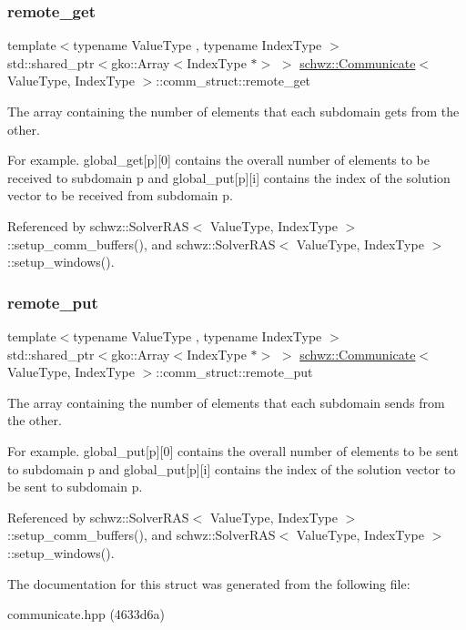 \subsubsection{\texorpdfstring{remote\+\_\+get}{remote\_get}}
{\footnotesize\ttfamily template$<$typename Value\+Type , typename Index\+Type $>$ \\
std\+::shared\+\_\+ptr$<$gko\+::\+Array$<$Index\+Type $\ast$$>$ $>$ \hyperlink{classschwz_1_1Communicate}{schwz\+::\+Communicate}$<$ Value\+Type, Index\+Type $>$\+::comm\+\_\+struct\+::remote\+\_\+get}



The array containing the number of elements that each subdomain gets from the other. 

For example. global\+\_\+get\mbox{[}p\mbox{]}\mbox{[}0\mbox{]} contains the overall number of elements to be received to subdomain p and global\+\_\+put\mbox{[}p\mbox{]}\mbox{[}i\mbox{]} contains the index of the solution vector to be received from subdomain p. 

Referenced by schwz\+::\+Solver\+R\+A\+S$<$ Value\+Type, Index\+Type $>$\+::setup\+\_\+comm\+\_\+buffers(), and schwz\+::\+Solver\+R\+A\+S$<$ Value\+Type, Index\+Type $>$\+::setup\+\_\+windows().

\mbox{\label{structschwz_1_1Communicate_1_1comm__struct_a977cf8a2800021a50e59ee5cefb2a0ca}} 
\subsubsection{\texorpdfstring{remote\+\_\+put}{remote\_put}}
{\footnotesize\ttfamily template$<$typename Value\+Type , typename Index\+Type $>$ \\
std\+::shared\+\_\+ptr$<$gko\+::\+Array$<$Index\+Type $\ast$$>$ $>$ \hyperlink{classschwz_1_1Communicate}{schwz\+::\+Communicate}$<$ Value\+Type, Index\+Type $>$\+::comm\+\_\+struct\+::remote\+\_\+put}



The array containing the number of elements that each subdomain sends from the other. 

For example. global\+\_\+put\mbox{[}p\mbox{]}\mbox{[}0\mbox{]} contains the overall number of elements to be sent to subdomain p and global\+\_\+put\mbox{[}p\mbox{]}\mbox{[}i\mbox{]} contains the index of the solution vector to be sent to subdomain p. 

Referenced by schwz\+::\+Solver\+R\+A\+S$<$ Value\+Type, Index\+Type $>$\+::setup\+\_\+comm\+\_\+buffers(), and schwz\+::\+Solver\+R\+A\+S$<$ Value\+Type, Index\+Type $>$\+::setup\+\_\+windows().



The documentation for this struct was generated from the following file\+:\begin{DoxyCompactItemize}
\item 
communicate.\+hpp (4633d6a)\end{DoxyCompactItemize}
